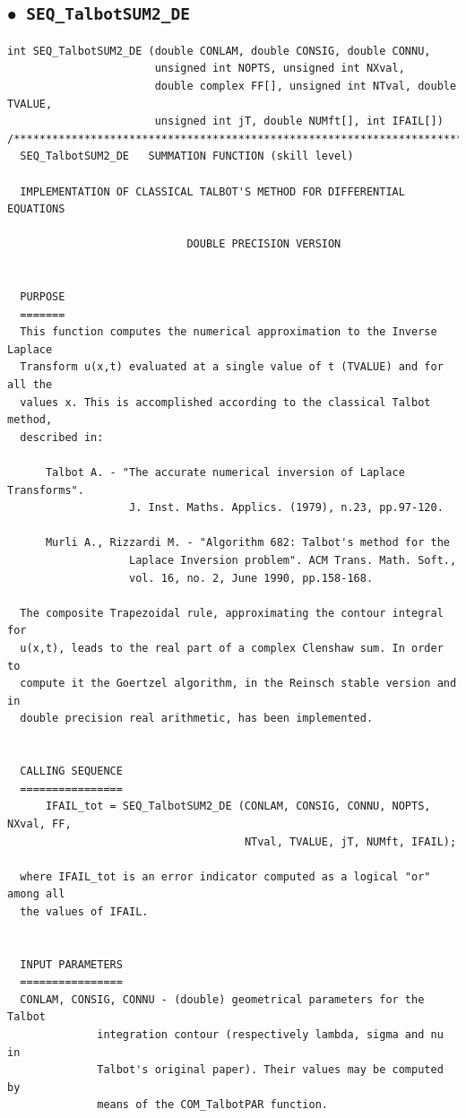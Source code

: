 \documentclass[a4paper,10pt]{report}%
\begin{document}
\subsection{\texorpdfstring{$\boldsymbol{\bullet}$}{ - }{\tt\ SEQ\_TalbotSUM2\_DE}}
\begin{lstlisting}
int SEQ_TalbotSUM2_DE (double CONLAM, double CONSIG, double CONNU,
                       unsigned int NOPTS, unsigned int NXval,
                       double complex FF[], unsigned int NTval, double TVALUE,
                       unsigned int jT, double NUMft[], int IFAIL[])
/*****************************************************************************
  SEQ_TalbotSUM2_DE   SUMMATION FUNCTION (skill level)

  IMPLEMENTATION OF CLASSICAL TALBOT'S METHOD FOR DIFFERENTIAL EQUATIONS

                            DOUBLE PRECISION VERSION


  PURPOSE
  =======
  This function computes the numerical approximation to the Inverse Laplace
  Transform u(x,t) evaluated at a single value of t (TVALUE) and for all the
  values x. This is accomplished according to the classical Talbot method,
  described in:

      Talbot A. - "The accurate numerical inversion of Laplace Transforms".
                   J. Inst. Maths. Applics. (1979), n.23, pp.97-120.

      Murli A., Rizzardi M. - "Algorithm 682: Talbot's method for the
                   Laplace Inversion problem". ACM Trans. Math. Soft.,
                   vol. 16, no. 2, June 1990, pp.158-168.

  The composite Trapezoidal rule, approximating the contour integral for
  u(x,t), leads to the real part of a complex Clenshaw sum. In order to
  compute it the Goertzel algorithm, in the Reinsch stable version and in
  double precision real arithmetic, has been implemented.


  CALLING SEQUENCE
  ================
      IFAIL_tot = SEQ_TalbotSUM2_DE (CONLAM, CONSIG, CONNU, NOPTS, NXval, FF,
                                     NTval, TVALUE, jT, NUMft, IFAIL);

  where IFAIL_tot is an error indicator computed as a logical "or" among all
  the values of IFAIL.


  INPUT PARAMETERS
  ================
  CONLAM, CONSIG, CONNU - (double) geometrical parameters for the Talbot
              integration contour (respectively lambda, sigma and nu in
              Talbot's original paper). Their values may be computed by
              means of the COM_TalbotPAR function.


\end{lstlisting}
\end{document}
